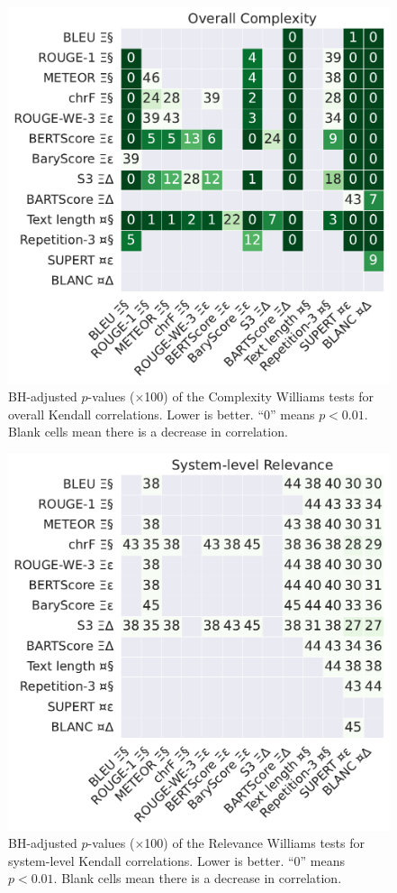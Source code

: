 \begin{figure}[h]
    \centering
    \includegraphics[width=0.62\columnwidth]{pictures/williams_overall_kendall_Complexity.pdf}
    \caption{BH-adjusted $p$-values ($\times$100) of the Complexity Williams tests for overall Kendall correlations. Lower is better. ``0'' means $p<0.01$. Blank cells mean there is a decrease in correlation.}
    \label{fig:williams_overall_complexity}
\end{figure}

\begin{figure}[h]
    \centering
    \includegraphics[width=0.62\columnwidth]{pictures/williams_system_kendall_Relevance.pdf}
    \caption{BH-adjusted $p$-values ($\times$100) of the Relevance Williams tests for system-level Kendall correlations. Lower is better. ``0'' means $p<0.01$. Blank cells mean there is a decrease in correlation.}
    \label{fig:williams_system_relevance}
\end{figure}


